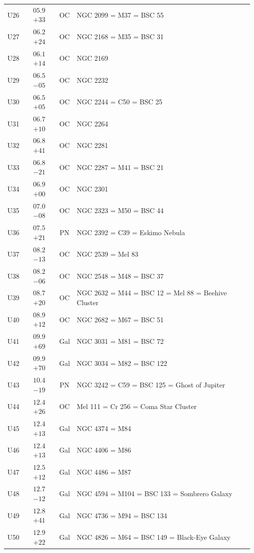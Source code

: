 \begin{table}[t]
\begin{tabularx}{\linewidth}{lccX}
U26  &$05.9$ $+33$&OC &NGC 2099 = M37 = BSC 55\\
U27  &$06.2$ $+24$&OC &NGC 2168 = M35 = BSC 31\\
U28  &$06.1$ $+14$&OC &NGC 2169\\
U29  &$06.5$ $-05$&OC &NGC 2232\\
U30  &$06.5$ $+05$&OC &NGC 2244 = C50 = BSC 25\\
U31  &$06.7$ $+10$&OC &NGC 2264\\
U32  &$06.8$ $+41$&OC &NGC 2281\\
U33  &$06.8$ $-21$&OC &NGC 2287 = M41 = BSC 21\\
U34  &$06.9$ $+00$&OC &NGC 2301\\
U35  &$07.0$ $-08$&OC &NGC 2323 = M50 = BSC 44\\
U36  &$07.5$ $+21$&PN &NGC 2392 = C39 = Eskimo Nebula\\
U37  &$08.2$ $-13$&OC &NGC 2539 = Mel 83\\
U38  &$08.2$ $-06$&OC &NGC 2548 = M48 = BSC 37\\
U39  &$08.7$ $+20$&OC &NGC 2632 = M44 = BSC 12 = Mel 88 = Beehive Cluster\\
U40  &$08.9$ $+12$&OC &NGC 2682 = M67 = BSC 51\\
U41  &$09.9$ $+69$&Gal&NGC 3031 = M81 = BSC 72\\
U42  &$09.9$ $+70$&Gal&NGC 3034 = M82 = BSC 122\\
U43  &$10.4$ $-19$&PN &NGC 3242 = C59 = BSC 125 = Ghost of Jupiter\\
U44  &$12.4$ $+26$&OC &Mel 111 = Cr 256 = Coma Star Cluster\\
U45  &$12.4$ $+13$&Gal&NGC 4374 = M84\\
U46  &$12.4$ $+13$&Gal&NGC 4406 = M86\\
U47  &$12.5$ $+12$&Gal&NGC 4486 = M87\\
U48  &$12.7$ $-12$&Gal&NGC 4594 = M104 = BSC 133 = Sombrero Galaxy\\
U49  &$12.8$ $+41$&Gal&NGC 4736 = M94 = BSC 134\\
U50  &$12.9$ $+22$&Gal&NGC 4826 = M64 = BSC 149 = Black-Eye Galaxy\\

        \hline
    \end{tabularx}
\end{table}
\clearpage


